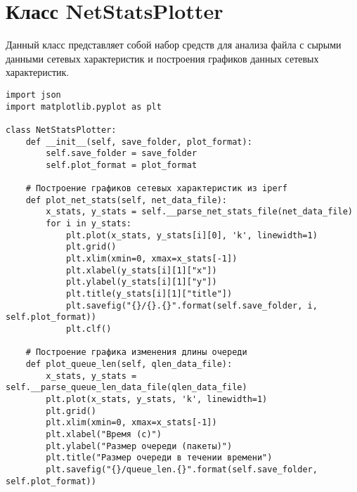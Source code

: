 \chapter{Класс NetStatsPlotter}

Данный класс представляет собой набор средств для анализа файла с сырыми
данными сетевых характеристик и построения графиков данных сетевых
характеристик.

\begin{verbatim}
import json
import matplotlib.pyplot as plt

class NetStatsPlotter:
    def __init__(self, save_folder, plot_format):
        self.save_folder = save_folder
        self.plot_format = plot_format

    # Построение графиков сетевых характеристик из iperf
    def plot_net_stats(self, net_data_file):
        x_stats, y_stats = self.__parse_net_stats_file(net_data_file)
        for i in y_stats:
            plt.plot(x_stats, y_stats[i][0], 'k', linewidth=1)
            plt.grid()
            plt.xlim(xmin=0, xmax=x_stats[-1])
            plt.xlabel(y_stats[i][1]["x"])
            plt.ylabel(y_stats[i][1]["y"])
            plt.title(y_stats[i][1]["title"])
            plt.savefig("{}/{}.{}".format(self.save_folder, i, self.plot_format))
            plt.clf()

    # Построение графика изменения длины очереди
    def plot_queue_len(self, qlen_data_file):
        x_stats, y_stats = self.__parse_queue_len_data_file(qlen_data_file)
        plt.plot(x_stats, y_stats, 'k', linewidth=1)
        plt.grid()
        plt.xlim(xmin=0, xmax=x_stats[-1])
        plt.xlabel("Время (с)")
        plt.ylabel("Размер очереди (пакеты)")
        plt.title("Размер очереди в течении времени")
        plt.savefig("{}/queue_len.{}".format(self.save_folder, self.plot_format))


\end{verbatim}
